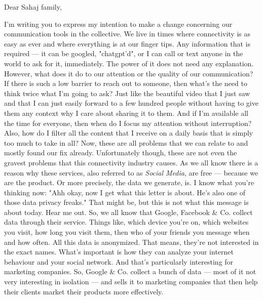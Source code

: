 \documentclass[12pt]{article}
\date{\today}
\begin{document}
\raggedright

{\small\the\year}

\bigskip

Dear Sahaj family,

\bigskip

I'm writing you to express my intention to make a change concerning our communication tools in the collective.
We live in times where connectivity is as easy as ever and where everything is at our finger tips.
Any information that is required --- it can be googled, "chatgpt'd", or I can call or text anyone in the world to ask for it, immediately.
The power of it does not need any explanation.
However, what does it do to our attention or the quality of our communication?
If there is such a low barrier to reach out to someone, then what's the need to think twice what I'm going to ask?
Just like the beautiful video that I just saw and that I can just easily forward to a few hundred people without having to give them any context why I care about sharing it to them.
And if I'm available all the time for everyone, then when do I focus my attention without interruption?
Also, how do I filter all the content that I receive on a daily basis that is simply too much to take in all?
Now, these are all problems that we can relate to and mostly found our fix already.
Unfortunately though, these are not even the gravest problems that this connectivity industry causes.
As we all know there is a reason why these services, also referred to as \textit{Social Media}, are free --- because we are the product.
Or more precisely, the data we generate, is.
I know what you're thinking now: "Ahh okay, now I get what this letter is about. He's also one of those data privacy freaks."
That might be, but this is not what this message is about today.
Hear me out.
So, we all know that Google, Facebook \& Co. collect data through their service.
Things like, which device you're on, which websites you visit, how long you visit them, then who of your friends you message when and how often.
All this data is anonymized.
That means, they're not interested in the exact names.
What's important is how they can analyze your internet behaviour and your social network.
And that's particularly interesting for marketing companies.
So, Google \& Co. collect a bunch of data --- most of it not very interesting in isolation --- and sells it to marketing companies that then help their clients market their products more effectively.
\end{document}
